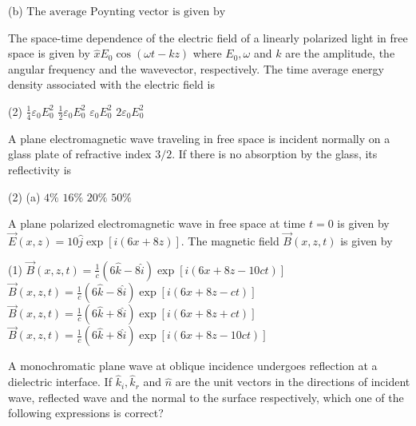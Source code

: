 \begin{enumerate}
\begin{minipage}{\textwidth}
	(b)$\text { The average Poynting vector is given by }$
\end{minipage}
\begin{minipage}{\textwidth}
	\item The space-time dependence of the electric field of a linearly polarized light in free space is given by $\hat{x} E_{0} \cos (\omega t-k z)$ where $E_{0}, \omega$ and $k$ are the amplitude, the angular frequency and the wavevector, respectively. The time average energy density associated with the electric field is
\end{minipage}
\begin{tasks}(2)
	\task[\textbf{A.}] $\frac{1}{4} \varepsilon_{0} E_{0}^{2}$
	\task[\textbf{B.}]$\frac{1}{2} \varepsilon_{0} E_{0}^{2}$
	\task[\textbf{C.}]$\varepsilon_{0} E_{0}^{2}$
	\task[\textbf{D.}]$2 \varepsilon_{0} E_{0}^{2}$
\end{tasks}
\begin{minipage}{\textwidth}
	\item A plane electromagnetic wave traveling in free space is incident normally on a glass plate of refractive index $3 / 2 .$ If there is no absorption by the glass, its reflectivity is
\end{minipage}
\begin{tasks}(2)
	\task[\textbf{A.}](a) $4 \%$
	\task[\textbf{B.}] $16 \%$
	\task[\textbf{C.}]$20 \%$
	\task[\textbf{D.}]$50 \%$
\end{tasks}
\begin{minipage}{\textwidth}
	\item A plane polarized electromagnetic wave in free space at time $t=0$ is given by $\vec{E}(x, z)=10 \hat{j} \exp [i(6 x+8 z)] .$ The magnetic field $\vec{B}(x, z, t)$ is given by
\end{minipage}
\begin{tasks}(1)
	\task[\textbf{A.}] $\vec{B}(x, z, t)=\frac{1}{c}(6 \hat{k}-8 \hat{i}) \exp [i(6 x+8 z-10 c t)]$ 
	\task[\textbf{C.}]$\vec{B}(x, z, t)=\frac{1}{c}(6 \hat{k}-8 \hat{i}) \exp [i(6 x+8 z-c t)]$
	\task[\textbf{D.}]$\vec{B}(x, z, t)=\frac{1}{c}(6 \hat{k}+8 \hat{i}) \exp [i(6 x+8 z+c t)]$
	\task[\textbf{B.}]$\vec{B}(x, z, t)=\frac{1}{c}(6 \hat{k}+8 \hat{i}) \exp [i(6 x+8 z-10 c t)]$
\end{tasks}
\begin{minipage}{\textwidth}
	\item A monochromatic plane wave at oblique incidence undergoes reflection at a dielectric interface. If $\hat{k}_{i}, \hat{k}_{r}$ and $\hat{n}$ are the unit vectors in the directions of incident wave, reflected wave and the normal to the surface respectively, which one of the following expressions is correct?

\end{minipage}
\end{enumerate}
